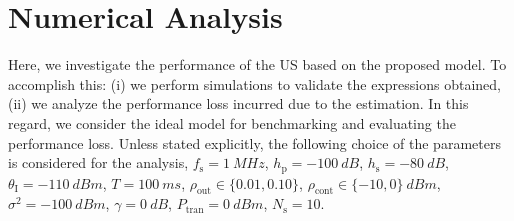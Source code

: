 \documentclass[letterpaper, twocolumn]{IEEEtran}
\newcommand{\sub}[1]{_{\text{#1}}}
\newcommand{\opc}{\rho\sub{out}}
\newcommand{\pc}{\rho\sub{cont}}
\newcommand{\preg}{P\sub{cont}}
\newcommand{\prcvd}{P\sub{rcvd}}
\newcommand{\ptran}{P\sub{tran}}
\newcommand{\ite}{\theta\sub{I}}
\newcommand{\gp}{h\sub{p}}
\newcommand{\gs}{h\sub{s}}
\newcommand{\nps}{\sigma^2}
\newcommand{\fsam}{f\sub{s}}
\newcommand{\Ks}{N\sub{s}}
\begin{document}

 
\section{Numerical Analysis} \label{sec:num_ana}
Here, we investigate the performance of the US based on the proposed model. To accomplish this: (i) we perform simulations to validate the expressions obtained, (ii) we analyze the performance loss incurred due to the estimation. In this regard, we consider the ideal model for benchmarking and evaluating the performance loss. %
Unless stated explicitly, the following choice of the parameters is considered for the analysis, $\fsam = \SI{1}{MHz}$, $\gp = \SI{-100}{dB}$, $\gs = \SI{-80}{dB}$, $\ite = \SI{-110}{dBm}$, $T = \SI{100}{ms}$, $\opc \in \{0.01, 0.10\}$, $\pc \in \{-10, 0\} \SI{}{dBm}$, $\nps = \SI{-100}{dBm}$, $\gamma = \SI{0}{dB}$, $\ptran = \SI{0}{dBm}$, $\Ks = 10$.


\end{document}
